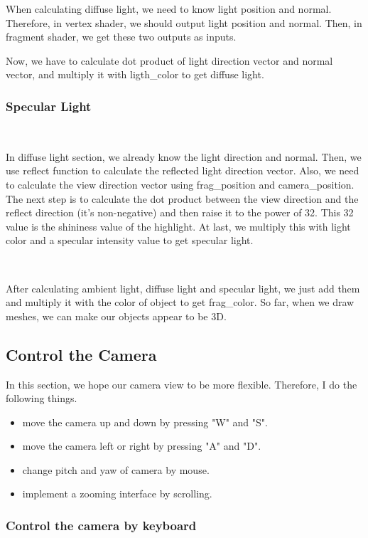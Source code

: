 \documentclass[acmtog]{acmart}
\begin{document}
When calculating diffuse light, we need to know light position and normal.
Therefore, in vertex shader, we should output light position and normal. Then, in fragment shader, we get these two outputs as inputs.

Now, we have to calculate dot product of light direction vector and normal vector, and multiply it with ligth\_color to get diffuse light.

\subsubsection{Specular Light}
~

In diffuse light section, we already know the light direction and normal. 
Then, we use reflect function to calculate the reflected light direction vector. Also, we need to calculate the view direction vector using frag\_position and camera\_position.
The next step is to calculate the dot product between the view direction and the reflect direction (it's non-negative) and then raise it to the power of 32. This 32 value is the shininess value of the highlight.
At last, we multiply this with light color and a specular intensity value to get specular light.

~

After calculating ambient light, diffuse light and specular light, we just add them and multiply it with the color of object to get frag\_color.
So far, when we draw meshes, we can make our objects appear to be 3D.

\subsection{Control the Camera}

In this section, we hope our camera view to be more flexible. Therefore, I do the following things.
\begin{itemize}
\item move the camera up and down by pressing "W" and "S".
\item move the camera left or right by pressing "A" and "D".
\item change pitch and yaw of camera by mouse.
\item implement a zooming interface by scrolling.
\end{itemize}

\subsubsection{Control the camera by keyboard}
~
\end{document}
